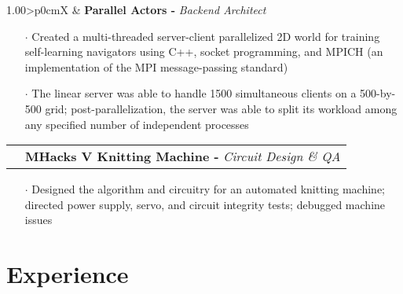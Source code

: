 \documentclass[a4paper, oneside, final]{scrartcl} %
\newcommand{\gray}{\rowcolor[gray]{.90}} %
\begin{document}
\begin{center}
  \begin{tabularx}{1.00\linewidth}{>{\raggedleft\scshape}p{0cm}X}
    \gray & \textbf{Parallel Actors -} \textit{Backend Architect}\\
  \end{tabularx}
  \begin{itemize}\itemsep-0.2cm
      \vspace{-0.1cm}
    \item[$\cdot$] Created a multi-threaded server-client parallelized 2D world for training self-learning navigators using C++, socket programming, and MPICH (an implementation of the MPI message-passing standard) \\
    \item[$\cdot$] The linear server was able to handle 1500 simultaneous clients on a 500-by-500 grid; post-parallelization, the server was able to split its workload among any specified number of independent processes \\
  \end{itemize}

  \begin{tabularx}{1.00\linewidth}{>{\raggedleft\scshape}p{0cm}X}
    \gray & \textbf{MHacks V Knitting Machine -} \textit{Circuit Design \& QA}\\
  \end{tabularx}
  \begin{itemize}\itemsep-0.2cm
      \vspace{-0.1cm}
    \item[$\cdot$] Designed the algorithm and circuitry for an automated knitting machine; directed power supply, servo, and circuit integrity tests; debugged machine issues \\

  \end{itemize}



  \section{Experience}


\end{center}
\end{document}
